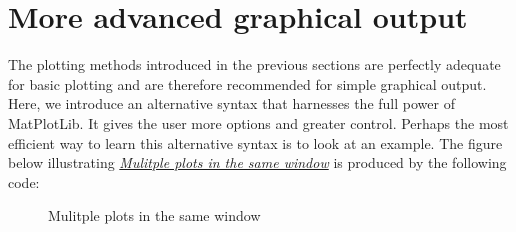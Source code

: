 \documentclass[letterpaper,10pt,english]{sphinxmanual}
\begin{document}
\section{More advanced graphical output}
\label{chap5/chap5_plot:more-advanced-graphical-output}
The plotting methods introduced in the previous sections are perfectly adequate for basic plotting and are therefore recommended for simple graphical output.  Here, we introduce an alternative syntax that harnesses the full power of MatPlotLib.  It gives the user more options and greater control.  Perhaps the most efficient way to learn this alternative syntax is to look at an example.  The figure below illustrating {\hyperref[chap5/chap5_plot:multplotdemo]{\emph{Mulitple plots in the same window}}} is produced by the following code:
\begin{figure}[htbp]
\centering
\capstart

\caption{Mulitple plots in the same window}\label{chap5/chap5_plot:multplotdemo}\end{figure}
\end{document}
